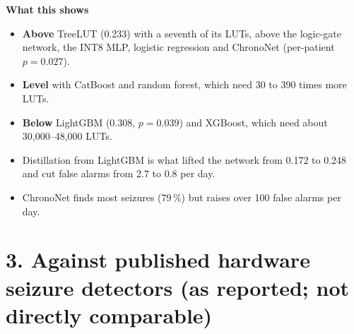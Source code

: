 \documentclass[10pt,a4paper,landscape]{article}
\begin{document}
\begin{minipage}[t]{0.38\textwidth}
\vspace{0pt}
\textbf{What this shows}
\begin{itemize}
\item \textbf{Above} TreeLUT (0.233) with a seventh of its LUTs, above the logic-gate network, the INT8 MLP,
  logistic regression and ChronoNet (per-patient $p = 0.027$).
\item \textbf{Level} with CatBoost and random forest, which need 30 to 390 times more LUTs.
\item \textbf{Below} LightGBM (0.308, $p = 0.039$) and XGBoost, which need about 30,000--48,000 LUTs.
\item Distillation from LightGBM is what lifted the network from 0.172 to 0.248 and cut false alarms from 2.7 to 0.8
  per day.
\item ChronoNet finds most seizures (79\,\%) but raises over 100 false alarms per day.
\end{itemize}
\end{minipage}

\section*{3. Against published hardware seizure detectors (as reported; not directly comparable)}
\end{document}
